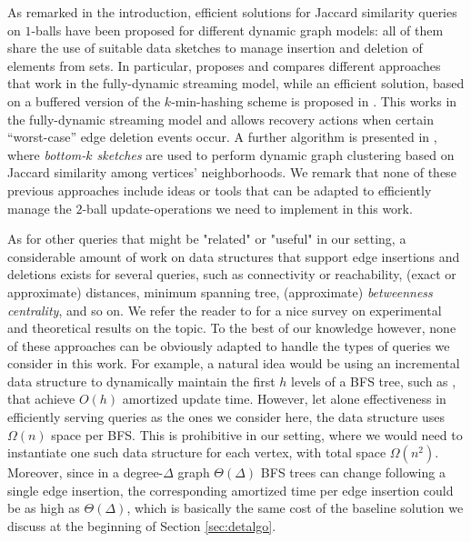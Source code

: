 
As remarked in the introduction, efficient solutions for Jaccard similarity queries on $1$-balls   have been proposed for different dynamic graph models: all of them share the use of suitable data sketches to manage insertion and deletion of elements from sets. In particular,  \cite{BSS20,MROS,VOS} proposes and compares different  approaches that work in  the fully-dynamic streaming model, while an efficient solution, based on a buffered version of the $k$-min-hashing scheme is proposed in \cite{CGPS24}. This works in the fully-dynamic streaming model and allows recovery actions when certain ``worst-case'' edge deletion events occur. A further algorithm is presented in \cite{zhang2022effective}, where \textit{bottom-$k$ sketches} \cite{cohen2007summarizing} are used to perform dynamic graph clustering based on Jaccard similarity among vertices' neighborhoods. We remark that 
none of these previous approaches include ideas or tools that can be adapted to efficiently manage the $2$-ball update-operations we need to implement in this work.



As for other queries that might be "related" or "useful" in our setting, a considerable amount of work on data structures that support edge insertions and deletions exists for several queries,  such as connectivity or reachability, (exact or approximate) distances, minimum spanning tree, (approximate) \textit{betweenness centrality}, and so on. We refer the reader to \cite{HanauerHS22} for a nice survey on experimental and theoretical results on the topic. To the best of our knowledge however, none of these approaches can be obviously adapted to handle the types of queries we consider in this work. For example, a natural idea would be using an incremental data structure to dynamically maintain the first $h$ levels of a BFS tree, such as \cite{EvenS81,RodittyZ11}, that achieve $O(h)$ amortized update time. However, let alone effectiveness in efficiently serving queries as the ones we consider here, the data structure uses $\Omega(n)$ space per BFS. This is prohibitive in our setting, where we would need to instantiate one such data structure for each vertex, with total space $\Omega(n^2)$. Moreover, since in a degree-$\Delta$ graph $\Theta(\Delta)$ BFS trees can change following a single edge insertion, the corresponding amortized time per edge insertion could be as high as $\Theta(\Delta)$, which is basically the same cost of the baseline solution we discuss at the beginning of Section \ref{sec:detalgo}.


